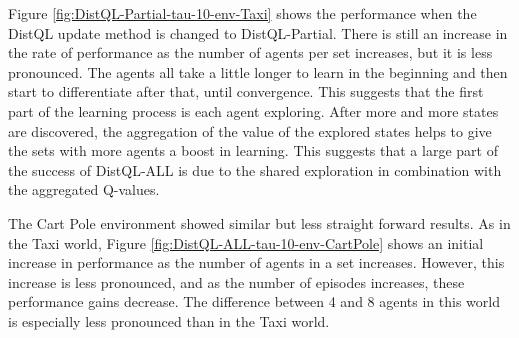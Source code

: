 \documentclass[jair,twoside,11pt,theapa]{article}
\begin{document}
Figure \ref{fig:DistQL-Partial-tau-10-env-Taxi} shows the performance when the DistQL update method is changed to DistQL-Partial. There is still an increase in the rate of performance as the number of agents per set increases, but it is less pronounced. The agents all take a little longer to learn in the beginning and then start to differentiate after that, until convergence. This suggests that the first part of the learning process is each agent exploring. After more and more states are discovered, the aggregation of the value of the explored states helps to give the sets with more agents a boost in learning. This suggests that a large part of the success of DistQL-ALL is due to the shared exploration in combination with the aggregated Q-values. 

The Cart Pole environment showed similar but less straight forward results. As in the Taxi world, Figure \ref{fig:DistQL-ALL-tau-10-env-CartPole} shows an initial increase in performance as the number of agents in a set increases. However, this increase is less pronounced, and as the number of episodes increases, these performance gains decrease. The difference between 4 and 8 agents in this world is especially less pronounced than in the Taxi world. 
\end{document}
